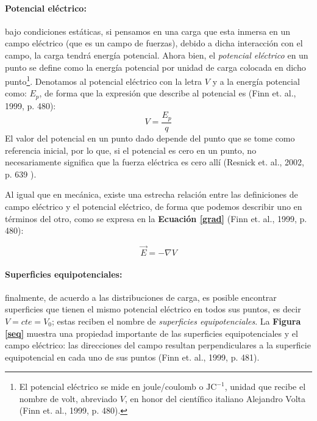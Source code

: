 \documentclass[letterpaper, 11 pt]{article}
\begin{document}
\begin{multicols}{2}
\paragraph{Potencial eléctrico:} bajo condiciones estáticas, si pensamos en una carga que esta inmersa en un campo eléctrico (que es un campo de fuerzas), debido a dicha interacción con el campo, la carga tendrá energía potencial. Ahora bien, el \textit{potencial eléctrico} en un punto se define como la energía potencial por unidad de carga colocada en dicho punto\footnote{El potencial eléctrico se mide en joule/coulomb o $\mathrm{J} \mathrm{C}^{-1}$, unidad que recibe el nombre de volt, abreviado $V$, en honor del científico italiano Alejandro Volta (Finn et. al., 1999, p. 480).}. Denotamos al potencial eléctrico con la letra $V$ y a la energía potencial como: $E_{p}$, de forma que la expresión que describe al potencial es (Finn et. al., 1999, p. 480):
\begin{equation}
    V = \frac{E_{p}}{q}
\end{equation}
El valor del potencial en un punto dado depende del punto que se tome como referencia inicial, por lo que, si el potencial es cero en un punto, no  necesariamente significa que la fuerza eléctrica es cero allí (Resnick et. al., 2002, p. 639 ).

Al igual que en mecánica, existe una estrecha relación entre las definiciones de campo eléctrico y el potencial eléctrico, de forma que podemos describir uno en términos del otro, como se expresa en la \textbf{Ecuación \ref{grad}} (Finn et. al., 1999, p. 480):

\begin{equation}
	\vec{E}=-\nabla V
	\label{grad}
\end{equation}

\paragraph{Superficies equipotenciales:} finalmente, de acuerdo a las distribuciones de carga, es posible encontrar superficies que tienen el mismo potencial eléctrico en todos sus puntos, es decir $V=cte=V_{0}$; estas reciben el nombre de \textit{superficies equipotenciales}. La \textbf{Figura \ref{seq}} muestra una propiedad importante de las superficies equipotenciales y el campo eléctrico: las direcciones del campo resultan perpendiculares a la superficie equipotencial en cada uno de sus puntos (Finn et. al., 1999, p. 481).


\end{multicols}
\end{document}
